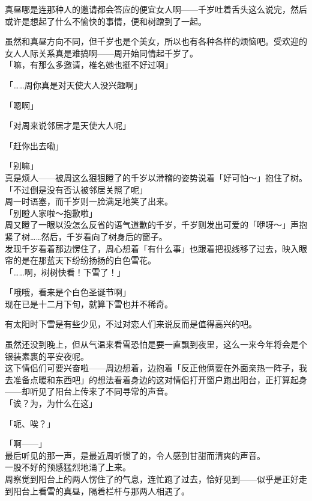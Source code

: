 真昼哪是连那种人的邀请都会答应的便宜女人啊——千岁吐着舌头这么说完，然后或许是想起了什么不愉快的事情，便和树蹭到了一起。

虽然和真昼方向不同，但千岁也是个美女，所以也有各种各样的烦恼吧。受欢迎的女人人际关系真是难搞啊——周开始同情起千岁了。\\

「嘛，有那么多邀请，椎名她也挺不好过啊」

「……周你真是对天使大人没兴趣啊」

「嗯啊」

「对周来说邻居才是天使大人呢」

「赶你出去嘞」

「别嘛」\\

真是烦人——被周这么狠狠瞪了的千岁以滑稽的姿势说着「好可怕～」抱住了树。\\

「不过倒是没有否认被邻居关照了呢」\\

周一时语塞，而千岁则一脸满足地笑了出来。\\

「别瞪人家啦～抱歉啦」\\

周又瞪了一眼以没怎么反省的语气道歉的千岁，千岁则发出可爱的「咿呀～」声抱紧了树……然后，千岁看向了树身后的窗子。\\

发现千岁看着那边愣住了，周心想着「有什么事」也跟着把视线移了过去，映入眼帘的是在那蓝天下纷纷扬扬的白色雪花。\\

「……啊，树树快看！下雪了！」

「哦哦，看来是个白色圣诞节啊」\\

现在已是十二月下旬，就算下雪也并不稀奇。

有太阳时下雪是有些少见，不过对恋人们来说反而是值得高兴的吧。

虽然还没到晚上，但从气温来看雪恐怕是要一直飘到夜里，这么一来今年将会是个银装素裹的平安夜呢。\\

这下情侣们可要兴奋啦——周边想着，边抱着「反正他俩要在外面亲热一阵子，我去准备点暖和东西吧」的想法看着身边的这对情侣打开窗户跑出阳台，正打算起身——却听见了阳台上传来了不同寻常的声音。\\

「诶？为，为什么在这」

「呃、唉？」

「啊——」\\

最后听见的那一声，是最近周听惯了的，令人感到甘甜而清爽的声音。\\

一股不好的预感猛烈地涌了上来。\\

周察觉到阳台上的两人愣住了的气息，连忙跑了过去，恰好见到——似乎是正好走到阳台上看雪的真昼，隔着栏杆与那两人相遇了。\\
